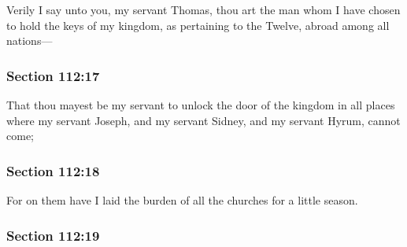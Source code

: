 		Verily I say unto you, my servant Thomas, thou art the man whom I have chosen to hold the keys of my kingdom, as pertaining to the Twelve, abroad among all nations---


	\subsubsection{Section 112:17} %
		\label{DC112-17}

		That thou mayest be my servant to unlock the door of the kingdom in all places where my servant Joseph, and my servant Sidney, and my servant Hyrum, cannot come;


	\subsubsection{Section 112:18} %
		\label{DC112-18}

		For on them have I laid the burden of all the churches for a little season.


	\subsubsection{Section 112:19} %
		\label{DC112-19}


